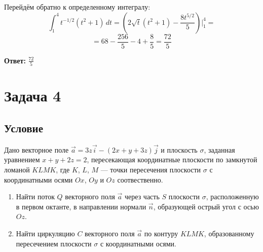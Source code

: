 \documentclass[12pt]{article}
\begin{document}
	Перейдём обратно к определенному интегралу:
	$$ \int_{1}^{4}t^{-1/2}(t^2+1)\,dt = (2\sqrt{t}(t^2+1) -  \frac{8t^{5/2}}{5})\Big|_1^{4}=$$ 
	$$= 68 -  \frac{256}{5}-4+  \frac{8}{5}=\frac{72}{5}$$ 
	
	\hspace{290pt}\textbf{Ответ:} $\frac{72}{5}$	
	\newpage
	\section*{Задача 4}	
	\subsection*{Условие}
	
	Дано векторное поле $\vec{a} =3z\vec{i} - (2x+y+3z)\vec{j}$ и плоскость $\sigma$, заданная уравнением $x + y + 2z = 2$, пересекающая координатные плоскости по замкнутой ломаной $KLMK$, где $K$, $L$, $M$ --- точки пересечения	плоскости $\sigma$ с координатными осями $ Ox $, $ Oy $ и $ Oz $ соотвественно.
	\begin{enumerate}
		\item Найти поток $Q$ векторного поля $\vec{a}$ через часть $S$ плоскости $ \sigma $, расположенную в первом октанте, в направлении нормали $ \vec{n} $, образующей острый угол с осью $ Oz $.
		\item Найти циркуляцию $C$ векторного поля $\vec{a}$ по контуру $ KLMK $, образованному пересечением плоскости $\sigma$ с координатными осями.
	\end{enumerate}
\end{document}
